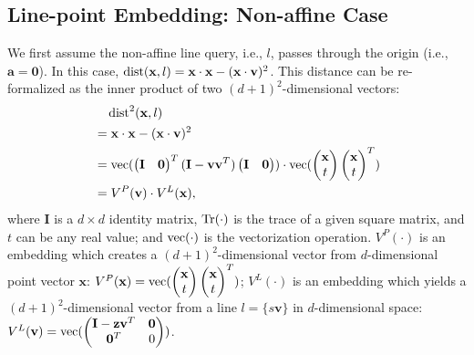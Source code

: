 \subsection{Line-point Embedding: Non-affine Case}
\label{subsubsec:3:embed}
We first assume the non-affine line query, i.e., $l$, passes through the origin (i.e., $\mathbf a = \mathbf 0$). In this case, $\operatorname{dist}(\mathbf x, l) = \mathbf x \cdot \mathbf x - (\mathbf x \cdot \mathbf v)^2$. This distance can be re-formalized as the inner product of two $(d+1)^2$-dimensional vectors:
\begin{align}
  \label{eq:3:dist}
  &\quad{} \operatorname{dist}^2(\mathbf x, l) \notag \\
  &= \mathbf x \cdot \mathbf x - (\mathbf x \cdot \mathbf v)^2 \notag \\
  &= \operatorname{vec}(\begin{pmatrix} \mathbf I & \mathbf 0 \end{pmatrix}^T (\mathbf I - \mathbf v \mathbf v^T) \begin{pmatrix} \mathbf I & \mathbf 0 \end{pmatrix}) \cdot \operatorname{vec}(\begin{pmatrix} \mathbf x \\ t \end{pmatrix} \begin{pmatrix} \mathbf x \\ t \end{pmatrix}^T) \\
  &= V^P(\mathbf v) \cdot V^L(\mathbf x), \notag
\end{align}
where $\mathbf I$ is a $d\times d$ identity matrix, $\operatorname{Tr}(\cdot)$ is the trace of a given square matrix, and $t$ can be any real value; and $\operatorname{vec}(\cdot)$ is the vectorization operation. $V^P(\cdot)$ is an embedding which creates a $(d+1)^2$-dimensional vector from $d$-dimensional point vector $\mathbf x$: $V^P(\mathbf x) =
\operatorname{vec}(\begin{pmatrix} \mathbf x \\ t \end{pmatrix} \begin{pmatrix} \mathbf x \\ t \end{pmatrix}^T)$; $V^L(\cdot)$ is an embedding which yields a $(d+1)^2$-dimensional vector from a line $l = \{s \mathbf v\}$ in $d$-dimensional space: $V^L(\mathbf v) = \operatorname{vec}(\begin{pmatrix} \mathbf I - \mathbf z \mathbf v^T & \mathbf 0 \\ \mathbf 0^T & 0 \end{pmatrix})$.

